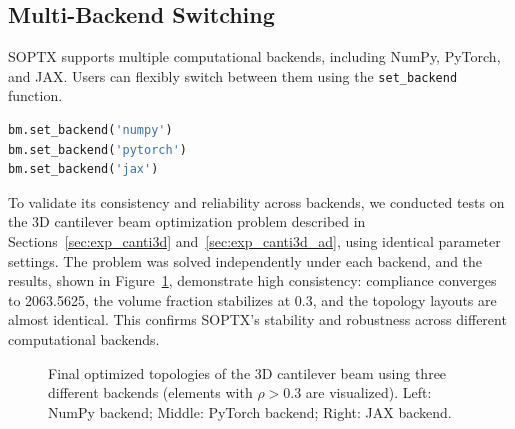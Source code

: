 \documentclass[mathpazo]{cicp}
\begin{document}
\subsection{Multi-Backend Switching}\label{sec:exp_multi_backend}
SOPTX supports multiple computational backends, including NumPy, PyTorch, and JAX. Users can flexibly switch between them using the \texttt{set\_backend} function.
\begin{lstlisting}[language=python]
bm.set_backend('numpy')    
bm.set_backend('pytorch') 
bm.set_backend('jax')     
\end{lstlisting}

To validate its consistency and reliability across backends, we conducted tests on the 3D cantilever beam optimization problem described in Sections~\ref{sec:exp_canti3d} and~\ref{sec:exp_canti3d_ad}, using identical parameter settings. The problem was solved independently under each backend, and the results, shown in Figure~\ref{fig:canti3d_backend_compare}, demonstrate high consistency: compliance converges to 2063.5625, the volume fraction stabilizes at 0.3, and the topology layouts are almost identical. This confirms SOPTX's stability and robustness across different computational backends.
\begin{figure}[htbp]
	\centering
	\caption{Final optimized topologies of the 3D cantilever beam using three different backends (elements with $\rho>0.3$ are visualized). Left: NumPy backend; Middle: PyTorch backend; Right: JAX backend.}
	\label{fig:canti3d_backend_compare}
\end{figure}
\end{document}
